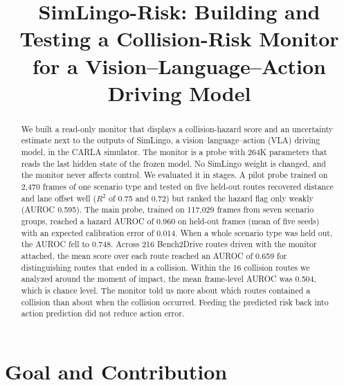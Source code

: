 \documentclass[conference]{IEEEtran}
\begin{document}
\title{SimLingo-Risk: Building and Testing a Collision-Risk Monitor for a Vision--Language--Action Driving Model}

\author{
}

\maketitle

\begin{abstract}
We built a read-only monitor that displays a collision-hazard score and an
uncertainty estimate next to the outputs of SimLingo, a vision--language--action
(VLA) driving model, in the CARLA simulator. The monitor is a probe with
264K parameters that reads the last hidden state of the frozen model. No SimLingo
weight is changed, and the monitor never affects control. We evaluated it in
stages. A pilot probe trained on 2{,}470 frames of one scenario type and tested on
five held-out routes recovered distance and lane offset well ($R^2$ of 0.75 and
0.72) but ranked the hazard flag only weakly (AUROC 0.595). The main probe, trained
on 117{,}029 frames from seven scenario groups, reached a hazard AUROC of 0.960 on
held-out frames (mean of five seeds) with an expected calibration error of 0.014. When a whole scenario type was held out, the AUROC fell to 0.748.
Across 216 Bench2Drive routes driven with the monitor attached, the mean score over
each route reached an AUROC of 0.659 for distinguishing routes that ended in a
collision. Within the 16 collision routes we analyzed around the moment of impact,
the mean frame-level AUROC was 0.504, which is chance level. The monitor told us
more about which routes contained a collision than about when the collision
occurred. Feeding the predicted risk back into action prediction did not reduce
action error.
\end{abstract}

\section{Goal and Contribution}
\label{sec:intro}
\end{document}
